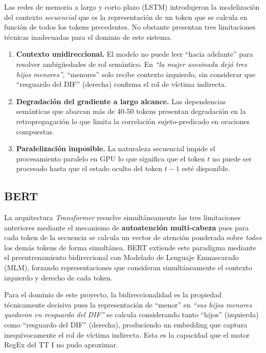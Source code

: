 Las redes de memoria a largo y corto plazo (LSTM) \cite{hochreiter1997lstm}
introdujeron la modelización del contexto \textit{secuencial} que es la representación
de un token que se calcula en función de todos los tokens precedentes. No obstante
presentan tres limitaciones técnicas inadecuadas para el dominio de este sistema.

\begin{enumerate}
    \item \textbf{Contexto unidireccional.} El modelo no puede leer ``hacia adelante''
          para resolver ambigüedades de rol semántico. En \textit{``la mujer asesinada
          dejó tres hijos menores''}, ``menores'' solo recibe contexto izquierdo,
          sin considerar que ``resguardo del DIF'' (derecha) confirma el rol
          de víctima indirecta.

    \item \textbf{Degradación del gradiente a largo alcance.} Las dependencias
          semánticas que abarcan más de 40-50 tokens presentan degradación en la
          retropropagación lo que limita la correlación sujeto-predicado en oraciones
          compuestas.

    \item \textbf{Paralelización imposible.} La naturaleza secuencial impide el
          procesamiento paralelo en GPU lo que significa que el token $t$ no puede ser procesado
          hasta que el estado oculto del token $t-1$ esté disponible.
\end{enumerate}

\subsection{BERT}
\label{subsec:ea_transformer}

La arquitectura \textit{Transformer} \cite{vaswani2017attention} resuelve
simultáneamente las tres limitaciones anteriores mediante el mecanismo de
\textbf{autoatención multi-cabeza} pues para cada token de la secuencia se calcula
un vector de atención ponderada sobre \textit{todos} los demás tokens de forma
simultánea. BERT \cite{devlin2019bert} extiende este paradigma mediante el
preentrenamiento bidireccional con Modelado de Lenguaje Enmascarado (MLM),
forzando representaciones que consideran simultáneamente el contexto izquierdo
y derecho de cada token.

Para el dominio de este proyecto, la bidireccionalidad es la propiedad
técnicamente decisiva pues la representación de ``menor'' en
\textit{``sus hijos menores quedaron en resguardo del DIF''} se calcula
considerando tanto ``hijos'' (izquierda) como ``resguardo del DIF'' (derecha),
produciendo un embedding que captura inequívocamente el rol de víctima indirecta.
Esta es la capacidad que el motor RegEx del TT I no pudo aproximar.

